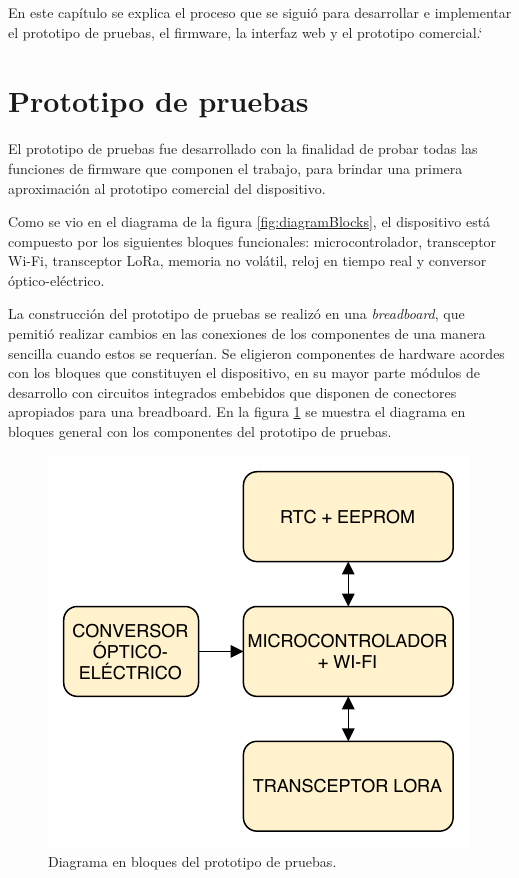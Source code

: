 
En este capítulo se explica el proceso que se siguió para desarrollar e implementar el prototipo de pruebas, el firmware, la interfaz web y el prototipo comercial.`


\section{Prototipo de pruebas}

El prototipo de pruebas fue desarrollado con la finalidad de probar todas las funciones de firmware que componen el trabajo, para brindar una primera aproximación al prototipo comercial del dispositivo.

Como se vio en el diagrama de la figura \ref{fig:diagramBlocks}, el dispositivo está compuesto por los siguientes bloques funcionales: microcontrolador, transceptor Wi-Fi, transceptor LoRa, memoria no volátil, reloj en tiempo real y conversor óptico-eléctrico.

La construcción del prototipo de pruebas se realizó en una \textit{breadboard}, que pemitió realizar cambios en las conexiones de los componentes de una manera sencilla cuando estos se requerían. Se eligieron componentes de hardware acordes con los bloques que constituyen el dispositivo, en su mayor parte módulos de desarrollo con circuitos integrados embebidos que disponen de conectores apropiados para una breadboard. En la figura \ref{fig:blocksTest} se muestra el diagrama en bloques general con los componentes del prototipo de pruebas.

\begin{figure}[h]
	\centering
	\includegraphics[scale=1]{./Figures/test_blocks.pdf}
	\caption{Diagrama en bloques del prototipo de pruebas.}
	\label{fig:blocksTest}
\end{figure}

